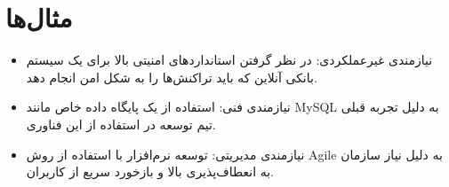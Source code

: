 \section*{مثال‌ها}
\begin{itemize}
	\item نیازمندی غیرعملکردی: در نظر گرفتن استانداردهای امنیتی بالا برای یک سیستم بانکی آنلاین که باید تراکنش‌ها را به شکل امن انجام دهد.
	
	\item نیازمندی فنی: استفاده از یک پایگاه داده خاص مانند MySQL به دلیل تجربه قبلی تیم توسعه در استفاده از این فناوری.
	
	\item نیازمندی مدیریتی: توسعه نرم‌افزار با استفاده از روش Agile به دلیل نیاز سازمان به انعطاف‌پذیری بالا و بازخورد سریع از کاربران.
	
\end{itemize}